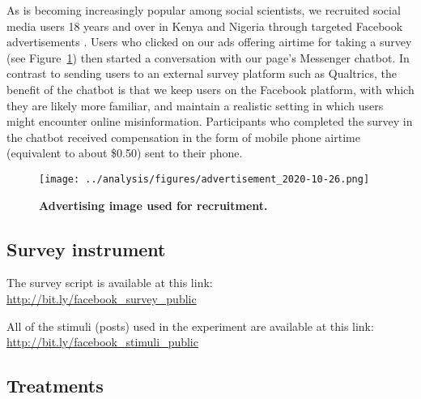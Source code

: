 \documentclass[letterpaper, 12pt, parskip=full,DIV=10]{scrartcl}
\begin{document}
As is becoming increasingly popular among social scientists, we recruited social media users 18 years and over in Kenya and Nigeria through targeted Facebook advertisements \citep{Rosenzweig_2020}. Users who clicked on our ads offering airtime for taking a survey (see Figure~\ref{fig:recruitment}) then started a conversation with our page's Messenger chatbot. In contrast to sending users to an external survey platform such as Qualtrics, the benefit of the chatbot is that we keep users on the Facebook platform, with which they are likely more familiar, and maintain a realistic setting in which users might encounter online misinformation. Participants who completed the survey in the chatbot received compensation in the form of mobile phone airtime (equivalent to about \$0.50) sent to their phone.

\begin{figure}[H]
\centering
\texttt{[image: ../analysis/figures/advertisement\_2020-10-26.png]}
   \caption{\textbf{Advertising image used for recruitment.}}
   \label{fig:recruitment}
\end{figure}

\subsection{Survey instrument}
The survey script is available at this link:\\
\url{http://bit.ly/facebook_survey_public}

All of the stimuli (posts) used in the experiment are available at this link:\\
\url{http://bit.ly/facebook_stimuli_public}

\subsection{Treatments}\label{appendix:treatments}
\end{document}
